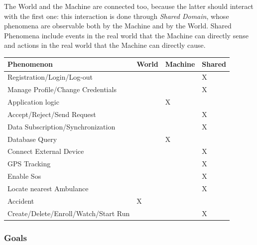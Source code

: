 \documentclass[a4paper]{article}
\begin{document}
        The World and the Machine are connected too, because the latter should interact with the first one: this interaction is done through \textit{Shared Domain}, whose phenomena are observable both by the Machine and by the World. Shared Phenomena include events in the real world that the Machine can directly sense and actions in the real world that the Machine can directly cause.
        \newpage
        \begin{table}[!htpb]
        \centering
        \begin{tabular}{|l|l|l|l|}
        \hline
         \textbf{Phenomenon} & \textbf{World} & \textbf{Machine} & \textbf{Shared}\\ \hline
         Registration/Login/Log-out & & & X \\ \hline
         Manage Profile/Change Credentials & & & X \\ \hline
         Application logic & & X & \\ \hline
         Accept/Reject/Send Request & & & X \\ \hline
         Data Subscription/Synchronization & & & X \\ \hline
         Database Query & & X & \\ \hline
         Connect External Device & & & X \\ \hline
         GPS Tracking & & & X \\ \hline
         Enable Sos & & & X \\ \hline
         Locate nearest Ambulance & & & X \\ \hline
         Accident & X & & \\ \hline
         Create/Delete/Enroll/Watch/Start Run & & & X \\ \hline
        \end{tabular}
        \end{table}
        
        \subsubsection{Goals}
        
\end{document}

